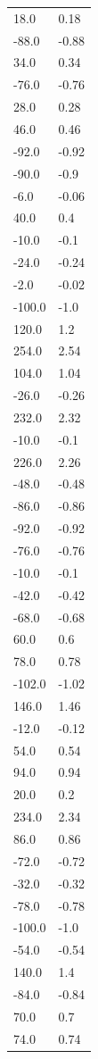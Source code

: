 \begin{longtable}{ll}
18.0 & 0.18 \\
-88.0 & -0.88 \\
34.0 & 0.34 \\
-76.0 & -0.76 \\
28.0 & 0.28 \\
46.0 & 0.46 \\
-92.0 & -0.92 \\
-90.0 & -0.9 \\
-6.0 & -0.06 \\
40.0 & 0.4 \\
-10.0 & -0.1 \\
-24.0 & -0.24 \\
-2.0 & -0.02 \\
-100.0 & -1.0 \\
120.0 & 1.2 \\
254.0 & 2.54 \\
104.0 & 1.04 \\
-26.0 & -0.26 \\
232.0 & 2.32 \\
-10.0 & -0.1 \\
226.0 & 2.26 \\
-48.0 & -0.48 \\
-86.0 & -0.86 \\
-92.0 & -0.92 \\
-76.0 & -0.76 \\
-10.0 & -0.1 \\
-42.0 & -0.42 \\
-68.0 & -0.68 \\
60.0 & 0.6 \\
78.0 & 0.78 \\
-102.0 & -1.02 \\
146.0 & 1.46 \\
-12.0 & -0.12 \\
54.0 & 0.54 \\
94.0 & 0.94 \\
20.0 & 0.2 \\
234.0 & 2.34 \\
86.0 & 0.86 \\
-72.0 & -0.72 \\
-32.0 & -0.32 \\
-78.0 & -0.78 \\
-100.0 & -1.0 \\
-54.0 & -0.54 \\
140.0 & 1.4 \\
-84.0 & -0.84 \\
70.0 & 0.7 \\
74.0 & 0.74 \\

\end{longtable}
